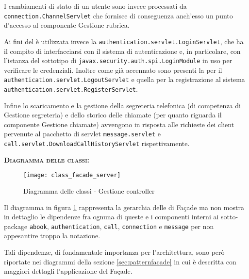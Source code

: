 \begin{description}
I cambiamenti di stato di un utente sono invece processati da \texttt{connection.ChannelServlet} che fornisce di conseguenza anch'esso un punto d'accesso al componente \textsf{Gestione rubrica}.

Ai fini del  è utilizzata invece la  \texttt{authentication.servlet.LoginServlet}, che ha il compito di interfacciarsi con il sistema di autenticazione e, in particolare, con l'istanza del sottotipo di \texttt{javax.security.auth.spi.LoginModule} in uso per verificare le credenziali. Inoltre come già accennato sono presenti la  per il  \texttt{authentication.servlet.LogoutServlet} e quella per la registrazione al sistema \texttt{authentication.servlet.RegisterServlet}.

Infine lo scaricamento e la gestione della segreteria telefonica (di competenza di \textsf{Gestione segreteria}) e dello storico delle chiamate (per quanto riguarda il componente \textsf{Gestione chiamate}) avvengono in risposta alle richieste dei client pervenute al pacchetto di servlet \texttt{message.servlet} e \texttt{call.servlet.DownloadCallHistoryServlet} rispettivamente. 

	\item{\scshape\bfseries Diagramma delle classi:}
\begin{figure}[H]
  \centering
  \texttt{[image: class\_facade\_server]}
  \caption{Diagramma delle classi - Gestione controller}\label{fig:facadeserver}
\end{figure}

Il diagramma in figura \ref{fig:facadeserver} rappresenta la gerarchia delle  di Façade ma non mostra in dettaglio le dipendenze fra ognuna di queste e i componenti interni ai sotto-package \texttt{abook}, \texttt{authentication}, \texttt{call}, \texttt{connection} e \texttt{message} per non appesantire troppo la notazione.

Tali dipendenze, di fondamentale importanza per l'architettura, sono però riportate nei diagrammi della sezione \vref{sec:patternfacade} in cui è descritta con maggiori dettagli l'applicazione del  Façade.
	

\end{description}
